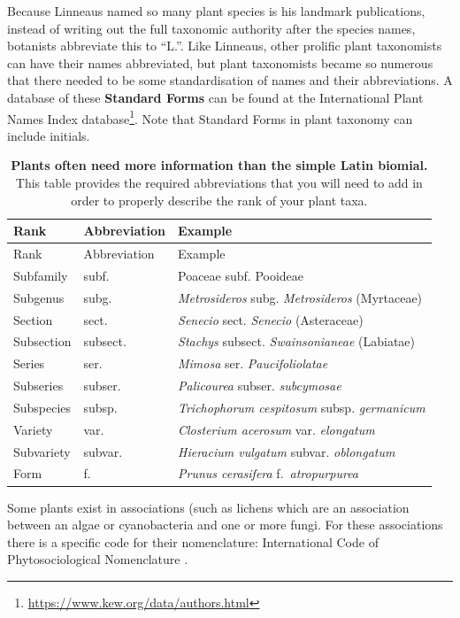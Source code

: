 \documentclass[
]{krantz}
\renewcommand{\href}[2]{#2\footnote{\url{#1}}}
\begin{document}
Because Linneaus named so many plant species is his landmark publications, instead of writing out the full taxonomic authority after the species names, botanists abbreviate this to ``L.''. Like Linneaus, other prolific plant taxonomists can have their names abbreviated, but plant taxonomists became so numerous that there needed to be some standardisation of names and their abbreviations. A database of these \textbf{Standard Forms} can be found at \href{https://www.kew.org/data/authors.html}{the International Plant Names Index database}. Note that Standard Forms in plant taxonomy can include initials.

\begin{longtable}[]{@{}lll@{}}
\caption{\label{tab:plantrank} \textbf{Plants often need more information than the simple Latin biomial.} This table provides the required abbreviations that you will need to add in order to properly describe the rank of your plant taxa.}\tabularnewline
\toprule
Rank & Abbreviation & Example \\
\midrule
\endfirsthead
\toprule
Rank & Abbreviation & Example \\
\midrule
\endhead
Subfamily & subf. & Poaceae subf. Pooideae \\
Subgenus & subg. & \emph{Metrosideros} subg. \emph{Metrosideros} (Myrtaceae) \\
Section & sect. & \emph{Senecio} sect. \emph{Senecio} (Asteraceae) \\
Subsection & subsect. & \emph{Stachys} subsect. \emph{Swainsonianeae} (Labiatae) \\
Series & ser. & \emph{Mimosa} ser. \emph{Paucifoliolatae} \\
Subseries & subser. & \emph{Palicourea} subser. \emph{subcymosae} \\
Subspecies & subsp. & \emph{Trichophorum cespitosum} subsp. \emph{germanicum} \\
Variety & var. & \emph{Closterium acerosum} var. \emph{elongatum} \\
Subvariety & subvar. & \emph{Hieracium vulgatum} subvar. \emph{oblongatum} \\
Form & f. & \emph{Prunus cerasifera} f.~\emph{atropurpurea} \\
\bottomrule
\end{longtable}

Some plants exist in associations (such as lichens which are an association between an algae or cyanobacteria and one or more fungi. For these associations there is a specific code for their nomenclature: International Code of Phytosociological Nomenclature \citep{theurillat2021international}.
\end{document}
